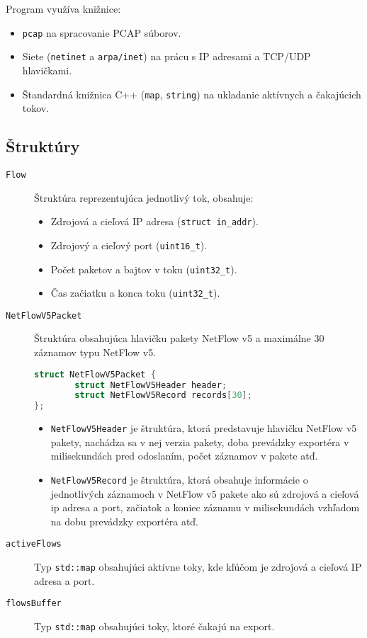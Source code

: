 \documentclass[11pt, a4paper]{article}
\begin{document}
Program využíva knižnice:
\begin{itemize}
    \item \texttt{pcap} na spracovanie PCAP súborov.
    \item Siete (\texttt{netinet} a \texttt{arpa/inet}) na prácu s IP adresami a TCP/UDP hlavičkami.
    \item Štandardná knižnica C++ (\texttt{map}, \texttt{string}) na ukladanie aktívnych a čakajúcich tokov.
\end{itemize}

\subsection*{Štruktúry}

\begin{description}
    \item[\texttt{Flow}] Štruktúra reprezentujúca jednotlivý tok, obsahuje:
    \begin{itemize}
        \item Zdrojová a cieľová IP adresa (\texttt{struct in\_addr}).
        \item Zdrojový a cieľový port (\texttt{uint16\_t}).
        \item Počet paketov a bajtov v toku (\texttt{uint32\_t}).
        \item Čas začiatku a konca toku (\texttt{uint32\_t}).
    \end{itemize}
    \item[\texttt{NetFlowV5Packet}] Štruktúra obsahujúca hlavičku pakety NetFlow v5 a maximálne 30 záznamov typu NetFlow v5.
    \\
    \begin{lstlisting}[language=C++]
    struct NetFlowV5Packet {
        struct NetFlowV5Header header;
        struct NetFlowV5Record records[30];
};
\end{lstlisting}
    \begin{itemize}
        \item \texttt{NetFlowV5Header} je štruktúra, ktorá predstavuje hlavičku NetFlow v5 pakety, nachádza sa v nej verzia pakety, doba prevádzky exportéra v milisekundách pred odoslaním, počet záznamov v pakete atď.
        \item \texttt{NetFlowV5Record} je štruktúra, ktorá obsahuje informácie o jednotlivých záznamoch v NetFlow v5 pakete ako sú zdrojová a cieľová ip adresa a port, začiatok a koniec záznamu v milisekundách vzhľadom na dobu prevádzky exportéra atď. 
    \end{itemize}

    \item[\texttt{activeFlows}] 
    Typ \texttt{std::map} obsahujúci aktívne toky, kde kľúčom je zdrojová a cieľová IP adresa a port.
    \item[\texttt{flowsBuffer}] Typ \texttt{std::map} obsahujúci toky, ktoré čakajú na export. 
\end{description}
\end{document}

